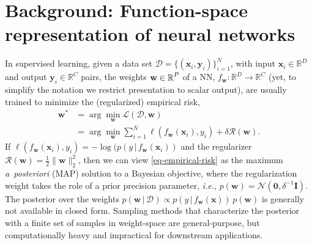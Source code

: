 \documentclass{article}
\makeatletter
\newcommand{\ie}{\textit{i.e.\@}\xspace}
\newcommand{\dataset}{\ensuremath{\mathcal{D}}}
\newcommand{\inputDomain}{\ensuremath{\mathbb{R}^{D}}}
\newcommand{\outputDomain}{\ensuremath{\mathbb{R}^{C}}}
\newcommand{\weights}{\ensuremath{\mathbf{w}}}
\newcommand{\mbf}[1]{\mathbf{#1}}
\renewcommand{\mid}{\,|\,}
\newcommand{\MI}{\mbf{I}}
\newcommand{\vzeros}{\mbf{0}}
\newcommand{\vx}{\mbf{x}}
\newcommand{\vy}{\mbf{y}}
\newcommand{\vw}{\mbf{w}}
\newcommand{\Norm}{\mathcal{N}}
\makeatother
\begin{document}
\section{Background: Function-space representation of neural networks}
\label{sec:methods}
%

%
In supervised learning, given a data set $\dataset = \{(\vx_{i} , \vy_{i})\}_{i=1}^{N}$, with input $\vx_i \in \inputDomain$ and output $\vy_i \in \outputDomain$ pairs, the weights $\weights \in \R^{P}$ of a NN, $f_\mathbf{w}: \inputDomain \to \outputDomain$ (yet, to simplify the notation we restrict presentation to scalar output), are usually trained to minimize the (regularized) empirical risk,
%
\begin{align} \label{eq-empirical-risk}
  \weights^{*} &=
  \arg \min_{\weights} \mathcal{L}(\dataset,\weights) \nonumber \\ &=
  \arg \min_{\weights} \textstyle\sum_{i=1}^{N} \ell(f_\weights(\mathbf{x}_{i}), y_i) + \delta \mathcal{R}(\weights).
\end{align}
%
If $\ell(f_\weights(\vx_{i}), y_i) = -\log(p(y \mid f_\weights(\vx_{i}))$ and the regularizer $\mathcal{R}(\weights) = \frac{1}{2}\|\weights\|^{2}_2$, then we can view \cref{eq-empirical-risk} as the maximum {\it a~posteriori} (MAP) solution to a Bayesian objective, where the regularization weight takes the role of a prior precision parameter, \ie, $p(\vw) = \Norm(\vzeros, \delta^{-1} \MI)$.
The posterior over the weights ${p(\vw \mid \dataset) \propto p(y \mid f_{\weights}(\vx)) \, p(\weights)}$ is generally not available in closed form. Sampling methods that characterize the posterior with a finite set of samples in weight-space are general-purpose, but computationally heavy and impractical for downstream applications.
\end{document}
